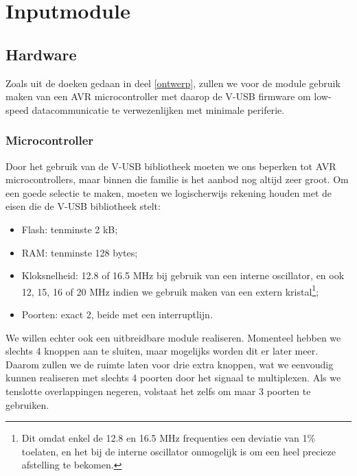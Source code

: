 \part{Inputmodule}
\label{inputmodule}

\chapter{Hardware}
\label{inputmodule:hardware}

Zoals uit de doeken gedaan in deel \ref{ontwerp}, zullen we voor de module gebruik maken van een AVR microcontroller met daarop de V-USB firmware om low-speed datacommunicatie te verwezenlijken met minimale periferie.

\section{Microcontroller}
\label{inputmodule:hardware:microcontroller}

Door het gebruik van de V-USB bibliotheek moeten we ons beperken tot AVR microcontrollers, maar binnen die familie is het aanbod nog altijd zeer groot. Om een goede selectie te maken, moeten we logischerwijs rekening houden met de eisen die de V-USB bibliotheek stelt:
\begin{itemize}
\item Flash: tenminste 2 kB;
\item RAM: tenminste 128 bytes;
\item Kloksnelheid: 12.8 of 16.5 MHz bij gebruik van een interne oscillator, en ook 12, 15, 16 of 20 MHz indien we gebruik maken van een extern kristal\footnote{Dit omdat enkel de 12.8 en 16.5 MHz frequenties een deviatie van 1\% toelaten, en het bij de interne oscillator onmogelijk is om een heel precieze afstelling te bekomen.};
\item Poorten: exact 2, beide met een interruptlijn.
\end{itemize}

We willen echter ook een uitbreidbare module realiseren. Momenteel hebben we slechts 4 knoppen aan te sluiten, maar mogelijks worden dit er later meer. Daarom zullen we de ruimte laten voor drie extra knoppen, wat we eenvoudig kunnen realiseren met slechts 4 poorten door het signaal te multiplexen. Als we tenslotte overlappingen negeren, volstaat het zelfs om maar 3 poorten te gebruiken.

